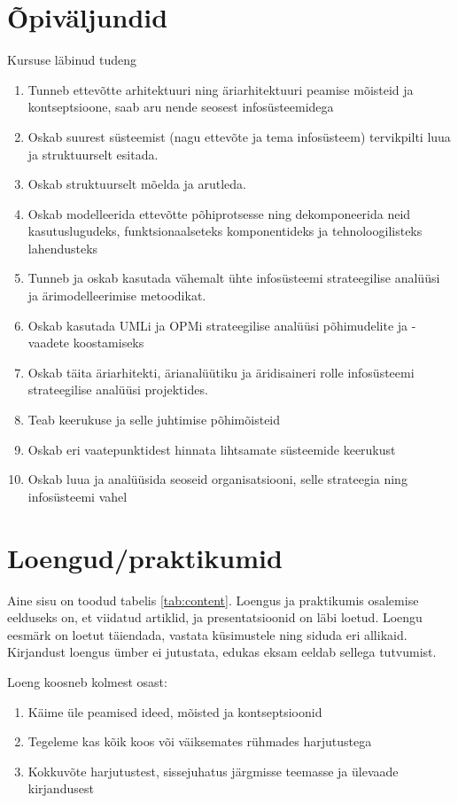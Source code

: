 \documentclass[nobib]{tufte-handout}
\begin{document}
\section{Õpiväljundid}
Kursuse läbinud tudeng 
\begin{enumerate}
	\item Tunneb ettevõtte arhitektuuri ning äriarhitektuuri peamise mõisteid ja kontseptsioone, saab aru nende seosest infosüsteemidega 
	\item Oskab suurest süsteemist (nagu ettevõte ja tema infosüsteem) tervikpilti luua ja struktuurselt esitada. 
	\item Oskab struktuurselt mõelda ja arutleda. 
	\item Oskab modelleerida ettevõtte põhiprotsesse ning dekomponeerida neid kasutuslugudeks, funktsionaalseteks komponentideks ja tehnoloogilisteks lahendusteks
	\item Tunneb ja oskab kasutada vähemalt ühte infosüsteemi strateegilise analüüsi ja ärimodelleerimise metoodikat. 
	\item Oskab kasutada UMLi ja OPMi strateegilise analüüsi põhimudelite ja -vaadete koostamiseks 
	\item Oskab täita äriarhitekti, ärianalüütiku ja äridisaineri rolle infosüsteemi strateegilise analüüsi projektides. 
	\item Teab keerukuse ja selle juhtimise põhimõisteid
	\item Oskab eri vaatepunktidest hinnata lihtsamate süsteemide keerukust
	\item Oskab luua ja analüüsida seoseid organisatsiooni, selle strateegia ning infosüsteemi vahel
\end{enumerate}

\section{Loengud/praktikumid}
Aine sisu on toodud tabelis \ref{tab:content}. Loengus ja praktikumis osalemise eelduseks on, et viidatud artiklid, ja presentatsioonid on läbi loetud. Loengu eesmärk on loetut täiendada, vastata küsimustele ning siduda eri allikaid. Kirjandust loengus ümber ei jutustata, edukas eksam eeldab sellega tutvumist. 

Loeng koosneb kolmest osast:
\begin{enumerate}
	\item Käime üle peamised ideed, mõisted ja kontseptsioonid
	\item Tegeleme kas kõik koos või väiksemates rühmades harjutustega
	\item Kokkuvõte harjutustest, sissejuhatus järgmisse teemasse ja ülevaade kirjandusest
\end{enumerate}
\end{document}
